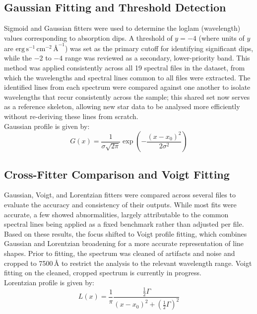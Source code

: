 \documentclass[12pt]{article}
\begin{document}
\subsection{Gaussian Fitting and Threshold Detection}
 
Sigmoid and Gaussian fitters were used to determine the loglam (wavelength) values corresponding to absorption dips. A threshold of $y = -4$ (where units of $y$ are $\mathrm{erg\,s^{-1}\,cm^{-2}\,\text{\AA}^{-1}}$) was set as the primary cutoff for identifying significant dips, while the $-2$ to $-4$ range was reviewed as a secondary, lower-priority band. This method was applied consistently across all 19 spectral files in the dataset, from which the wavelengths and spectral lines common to all files were extracted. The identified lines from each spectrum were compared against one another to isolate wavelengths that recur consistently across the sample; this shared set now serves as a reference skeleton, allowing new star data to be analysed more efficiently without re-deriving these lines from scratch.\\
Gaussian profile is given by:
\begin{equation}
G(x) = \frac{1}{\sigma\sqrt{2\pi}}\exp\left(-\frac{(x-x_0)^2}{2\sigma^2}\right)
\end{equation}
 
\subsection{Cross-Fitter Comparison and Voigt Fitting}
 
Gaussian, Voigt, and Lorentzian fitters were compared across several files to evaluate the accuracy and consistency of their outputs. While most fits were accurate, a few showed abnormalities, largely attributable to the common spectral lines being applied as a fixed benchmark rather than adjusted per file. Based on these results, the focus shifted to Voigt profile fitting, which combines Gaussian and Lorentzian broadening for a more accurate representation of line shapes. Prior to fitting, the spectrum was cleaned of artifacts and noise and cropped to 7500\,\r{A} to restrict the analysis to the relevant wavelength range. Voigt fitting on the cleaned, cropped spectrum is currently in progress.\\

Lorentzian profile is given by:
\begin{equation}
L(x) = \frac{1}{\pi}\frac{\frac{1}{2}\Gamma}{(x-x_0)^2 + \left(\frac{1}{2}\Gamma\right)^2}
\end{equation}
\end{document}
